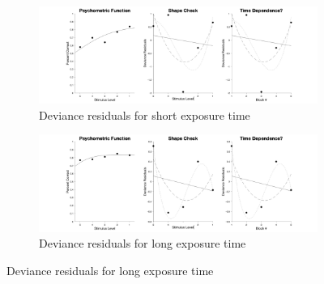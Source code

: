 \documentclass{article}
\begin{document}
\begin{figure}[!hb]
    \begin{subfigure}{\textwidth}
        \centering
        \includegraphics[width = \linewidth]{Thesis/plots/gof/cutNo/cutNo_re_short_deviance.png}
        \caption{Deviance residuals for short exposure time}
    \end{subfigure}
    
    \begin{subfigure}{\textwidth}
        \centering
        \includegraphics[width = \linewidth]{Thesis/plots/gof/cutNo/cutNo_re_long_deviance.png}
        \caption{Deviance residuals for long exposure time}
    \end{subfigure}
\end{figure}

\clearpage
\end{document}
